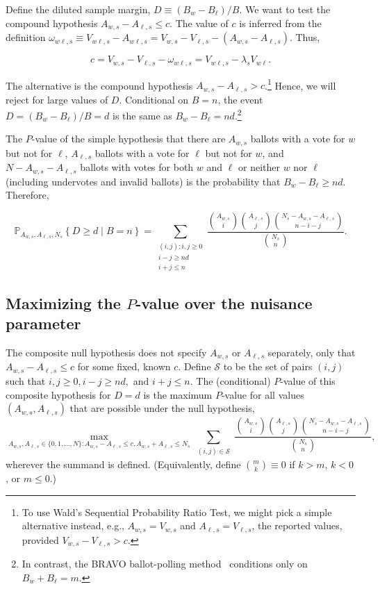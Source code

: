 \documentclass[runningheads]{llncs}
\newcommand{\beq}{\begin{equation}}
\newcommand{\eeq}{\end{equation}}
\begin{document}
Define the diluted sample margin, $D \equiv (B_w - B_\ell)/B$.
We want to test the compound hypothesis $A_{w,s} - A_{\ell,s} \le c$.
The value of $c$ is inferred from the definition
$\omega_{w\ell,s} \equiv V_{w\ell,s} - A_{w\ell,s} = V_{w,s} - V_{\ell,s} - (A_{w,s} -A_{\ell,s})$.
Thus,

\beq
    c = V_{w,s} - V_{\ell,s} - \omega_{w\ell,s} = V_{w\ell,s} - \lambda_s V_{w\ell}.
\eeq

The alternative is the compound hypothesis 
$A_{w,s} - A_{\ell,s} > c$.\footnote{%
    To use Wald's Sequential Probability Ratio Test, we might pick a simple alternative instead, e.g.,
   $A_{w,s} = V_{w,s}$ and $A_{\ell,s} = V_{\ell,s}$, the reported values, provided 
   $V_{w,s} - V_{\ell,s} > c$.
}
Hence, we will reject for large values of $D$.
Conditional on $B=n$, the event $D = (B_w - B_\ell)/B = d$ is the same as $B_w - B_\ell = nd$.\footnote{%
In contrast, the BRAVO ballot-polling
method~\cite{lindemanEtal12}
conditions only on $B_w+B_\ell = m$.
}


The $P$-value of the simple hypothesis that there are $A_{w,s}$ ballots with
a vote for $w$ but not for $\ell$, $A_{\ell,s}$ ballots with a vote for $\ell$ but not for $w$, 
and $N - A_{w,s} - A_{\ell,s}$ ballots with votes for both $w$ and $\ell$ or neither $w$ nor $\ell$ 
(including undervotes and
invalid ballots) is the probability that $B_w - B_\ell \geq nd$.
Therefore,

\begin{equation}
   \mathbb{P}_{A_{w,s}, A_{\ell,s}, N_s} \left \{ D \geq d \;\vert\; B = n\right \} = 
   \sum_{\substack{(i, j) :  i, j\ge 0 \\ i-j \geq nd \\ i+j \leq n}} \frac{ {A_{w,s } \choose i}{A_{\ell,s} \choose j}{N_s - A_{w,s} - A_{\ell,s} \choose n-i-j}}{{N_s \choose n}}.
\end{equation}



\subsection{Maximizing the $P$-value over the nuisance parameter}

The composite null hypothesis does not specify $A_{w,s}$ or $A_{\ell,s}$ separately, only 
that $A_{w,s} - A_{\ell,s} \le c$ for
some fixed, known $c$.
Define $\mathcal{S}$ to be the set of pairs $(i, j)$ such that $i, j\ge 0, i-j \ge nd,$ and $ i+j \leq n$.
The (conditional) $P$-value of this composite hypothesis for $D=d$ is the maximum $P$-value for all
values $(A_{w,s}, A_{\ell,s})$ that are possible under the null hypothesis,
\begin{equation}
  \max_{A_{w,s}, A_{\ell,s} \in \{0, 1, \ldots, N \}: A_{w,s} - A_{\ell,s} \le c, A_{w,s} + A_{\ell,s} \le N_s}
   \sum_{\substack{(i, j)\in \mathcal{S}}} \frac{ {A_{w,s } \choose i}{A_{\ell,s} \choose j}{N_s - A_{w,s} - A_{\ell,s} \choose n-i-j}}{{N_s \choose n}},
\end{equation}
wherever the summand is defined. 
(Equivalently, define ${m \choose k} \equiv 0$ if $k > m$, $k < 0$, or $m \le 0$.)
\end{document}
